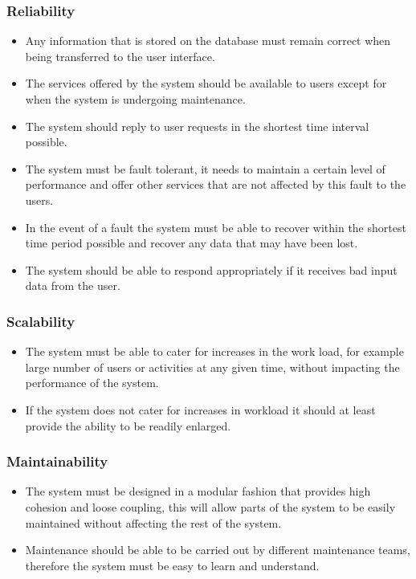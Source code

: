 \documentclass{article}
\begin{document}
		\subsubsection{Reliability}

			\begin{itemize}
				\item Any information that is stored on the database must remain correct when being transferred to the user interface.
				\item The services offered by the system should be available to users except for when the system is undergoing maintenance.
				\item The system should reply to user requests in the shortest time interval possible.
				\item The system must be fault tolerant, it needs to maintain a certain level of performance and offer other services that are not affected by this fault to the users.
				\item In the event of a fault the system must be able to recover within the shortest time period possible and recover any data that may have been lost.
				\item The system should be able to respond appropriately if it receives bad input data from the user.
			\end{itemize}

		\subsubsection{Scalability}
			\begin{itemize}
				\item The system must be able to cater for increases in the work load, for example large number of users or activities at any given time, without impacting the performance of the system.
				\item If the system does not cater for increases in workload it should at least provide the ability to be readily enlarged.
			\end{itemize}
		
		\subsubsection{Maintainability}
			\begin{itemize}
				\item The system must be designed in a modular fashion that provides high cohesion and loose coupling, this will allow parts of the system to be easily maintained without affecting the rest of the system.
				\item Maintenance should be able to be carried out by different maintenance teams, therefore the system must be easy to learn and understand.
			\end{itemize}
\end{document}
